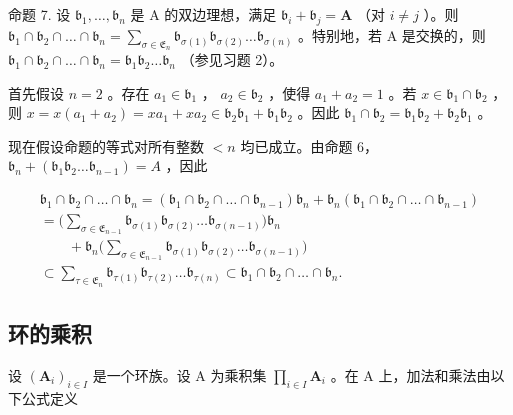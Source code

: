 命题 7. 设 \(\mathfrak{b}_1, \ldots, \mathfrak{b}_n\) 是 A 的双边理想，满足 \(\mathfrak{b}_i + \mathfrak{b}_j = \mathbf{A}\) （对 \(i \neq j\) ）。则 \(\mathfrak{b}_1 \cap \mathfrak{b}_2 \cap \dots \cap \mathfrak{b}_n = \sum_{\sigma \in \mathfrak{E}_n} \mathfrak{b}_{\sigma(1)} \mathfrak{b}_{\sigma(2)} \ldots \mathfrak{b}_{\sigma(n)}\) 。特别地，若 A 是交换的，则 \(\mathfrak{b}_1 \cap \mathfrak{b}_2 \cap \dots \cap \mathfrak{b}_n = \mathfrak{b}_1 \mathfrak{b}_2 \ldots \mathfrak{b}_n\) （参见习题 2）。

首先假设 \(n = 2\) 。存在 \(a_1 \in \mathfrak{b}_1\) ， \(a_2 \in \mathfrak{b}_2\) ，使得 \(a_1 + a_2 = 1\) 。若 \(x \in \mathfrak{b}_1 \cap \mathfrak{b}_2\) ，则 \(x = x(a_1 + a_2) = xa_1 + xa_2 \in \mathfrak{b}_2\mathfrak{b}_1 + \mathfrak{b}_1\mathfrak{b}_2\) 。因此 \(\mathfrak{b}_1 \cap \mathfrak{b}_2 = \mathfrak{b}_1\mathfrak{b}_2 + \mathfrak{b}_2\mathfrak{b}_1\) 。

现在假设命题的等式对所有整数 \(<n\) 均已成立。由命题 6， \(\mathfrak{b}_{n} + (\mathfrak{b}_{1}\mathfrak{b}_{2}\ldots \mathfrak{b}_{n - 1}) = A\) ，因此

\[
\begin{array}{l} \mathfrak {b} _ {1} \cap \mathfrak {b} _ {2} \cap \dots \cap \mathfrak {b} _ {n} = (\mathfrak {b} _ {1} \cap \mathfrak {b} _ {2} \cap \dots \cap \mathfrak {b} _ {n - 1}) \mathfrak {b} _ {n} + \mathfrak {b} _ {n} (\mathfrak {b} _ {1} \cap \mathfrak {b} _ {2} \cap \dots \cap \mathfrak {b} _ {n - 1}) \\ = \Big (\sum_ {\sigma \in \mathfrak {E} _ {n - 1}} \mathfrak {b} _ {\sigma (1)} \mathfrak {b} _ {\sigma (2)} \dots \mathfrak {b} _ {\sigma (n - 1)} \Big) \mathfrak {b} _ {n} \\ \qquad + \mathfrak {b} _ {n} \Big (\sum_ {\sigma \in \mathfrak {E} _ {n - 1}} \mathfrak {b} _ {\sigma (1)} \mathfrak {b} _ {\sigma (2)} \dots \mathfrak {b} _ {\sigma (n - 1)} \Big) \\ \subset \sum_ {\tau \in \mathfrak {E} _ {n}} \mathfrak {b} _ {\tau (1)} \mathfrak {b} _ {\tau (2)} \dots \mathfrak {b} _ {\tau (n)} \subset \mathfrak {b} _ {1} \cap \mathfrak {b} _ {2} \cap \dots \cap \mathfrak {b} _ {n}. \end{array}
\]

\subsection{环的乘积}

设 \((\mathbf{A}_i)_{i\in I}\) 是一个环族。设 A 为乘积集 \(\prod_{i\in I} \mathbf{A}_i\) 。在 A 上，加法和乘法由以下公式定义

